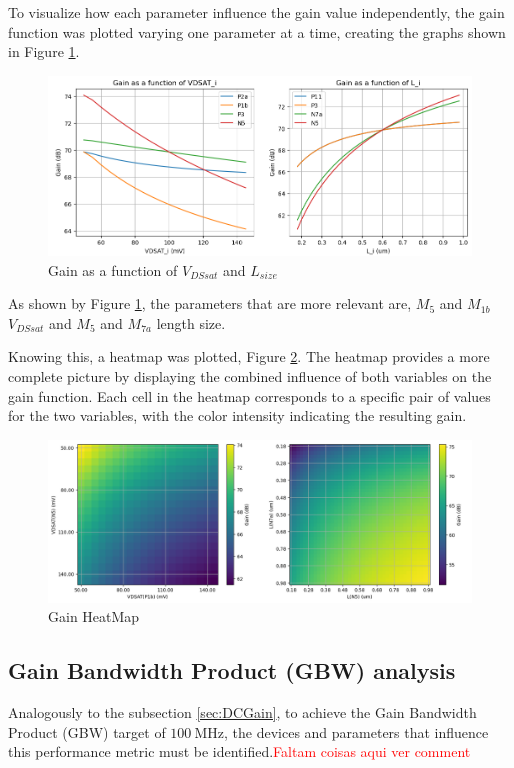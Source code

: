 To visualize how each parameter influence the gain value independently, the gain function was plotted varying one parameter at a time, creating the graphs shown in Figure \ref{fig:GainVariation}. 

\begin{figure}[H]
    \centering
    \includegraphics[width=1\textwidth]{Images/GainVariation.png}
    \caption{Gain as a function of $V_{DSsat}$ and $L_{size}$}
    \label{fig:GainVariation}
\end{figure}

As shown by Figure \ref{fig:GainVariation}, the parameters that are more relevant are, $M_{5}$ and $M_{1b}$ $V_{DSsat}$ and $M_{5}$ and $M_{7a}$ length size.

Knowing this, a heatmap was plotted, Figure \ref{fig:GainHeatMap}. The heatmap provides a more complete picture by displaying the combined influence of both variables on the gain function. Each cell in the heatmap corresponds to a specific pair of values for the two variables, with the color intensity indicating the resulting gain.

\begin{figure}[H]
    \centering
    \includegraphics[width=1\textwidth]{Images/GainHeatMap.png}
    \caption{Gain HeatMap}
    \label{fig:GainHeatMap}
\end{figure}


\subsection{Gain Bandwidth Product (GBW) analysis}
\label{sec:GBWPython}
Analogously to the subsection \ref{sec:DCGain}, to achieve the Gain Bandwidth Product (GBW) target of $\SI{100}{\mega\hertz}$, the devices and parameters that influence this performance metric must be identified.\textcolor{red}{Faltam coisas aqui ver comment}

